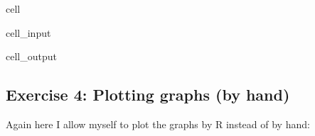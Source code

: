 \documentclass[letterpaper,10pt,english]{jupyterBook}
\begin{document}
\begin{sphinxuseclass}{cell}\begin{sphinxVerbatimInput}

\begin{sphinxuseclass}{cell_input}
\begin{sphinxVerbatim}[commandchars=\\\{\}]




\end{sphinxVerbatim}

\end{sphinxuseclass}\end{sphinxVerbatimInput}
\begin{sphinxVerbatimOutput}

\begin{sphinxuseclass}{cell_output}
\noindent{}

\end{sphinxuseclass}\end{sphinxVerbatimOutput}

\end{sphinxuseclass}

\subsection{Exercise 4: Plotting graphs (by hand)}
\label{\detokenize{exercises_unit_4:exercise-4-plotting-graphs-by-hand}}
\sphinxAtStartPar
Again here I allow myself to plot the graphs by R instead of by hand:
\end{document}
